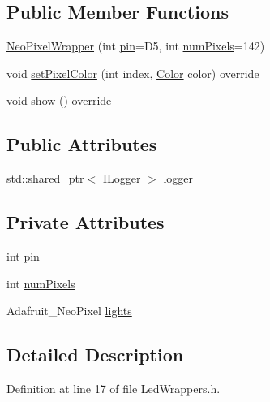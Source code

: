 \subsection*{Public Member Functions}
\begin{DoxyCompactItemize}
\item 
\hyperlink{class_neo_pixel_wrapper_afc5c5949b137bc56535915717ece34a3}{Neo\+Pixel\+Wrapper} (int \hyperlink{class_neo_pixel_wrapper_a879ef1b03cfd7c10f081d7bc6a048aad}{pin}=D5, int \hyperlink{class_neo_pixel_wrapper_a5134bf399bb6c272ae62208fea97ed79}{num\+Pixels}=142)
\item 
void \hyperlink{class_neo_pixel_wrapper_a2dc988a9c17e27f36f83acb63e875c10}{set\+Pixel\+Color} (int index, \hyperlink{struct_color}{Color} color) override
\item 
void \hyperlink{class_neo_pixel_wrapper_a965564daa3e81baefb9947c28633f06a}{show} () override
\end{DoxyCompactItemize}
\subsection*{Public Attributes}
\begin{DoxyCompactItemize}
\item 
std\+::shared\+\_\+ptr$<$ \hyperlink{class_i_logger}{I\+Logger} $>$ \hyperlink{class_neo_pixel_wrapper_a1e4129f56a27f2533dc8ed2c9ddde84b}{logger}
\end{DoxyCompactItemize}
\subsection*{Private Attributes}
\begin{DoxyCompactItemize}
\item 
int \hyperlink{class_neo_pixel_wrapper_a879ef1b03cfd7c10f081d7bc6a048aad}{pin}
\item 
int \hyperlink{class_neo_pixel_wrapper_a5134bf399bb6c272ae62208fea97ed79}{num\+Pixels}
\item 
Adafruit\+\_\+\+Neo\+Pixel \hyperlink{class_neo_pixel_wrapper_a059056899c5ab29bced35b32f05918c3}{lights}
\end{DoxyCompactItemize}


\subsection{Detailed Description}


Definition at line 17 of file Led\+Wrappers.\+h.



